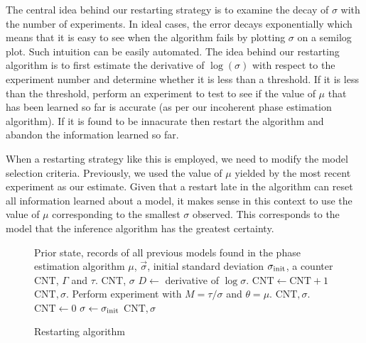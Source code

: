\documentclass[aps,pra,amsmath,twocolumn,amssymb,superscriptaddress]{revtex4-1}
\newcommand{\CRej}{\text{RejS }}
\begin{document}
The central idea behind our restarting strategy is to examine the decay of $\sigma$ with the number of experiments.  In ideal cases, the error decays exponentially which means that it is easy to see when the algorithm fails by plotting $\sigma$ on a semilog plot.  Such intuition can be easily automated.  The idea behind our restarting algorithm is to first estimate the derivative of $\log(\sigma)$ with respect to the experiment number and determine whether it is less than a threshold.  If it is less than the threshold, perform an experiment to test to see if the value of $\mu$ that has been learned so far is accurate (as per our incoherent phase estimation algorithm).  If it is found to be innacurate then restart the algorithm and abandon the information learned so far.

When a restarting strategy like this is employed, we need to modify the model selection criteria.  Previously, we used the value of $\mu$ yielded by the most recent experiment as our estimate.   Given that a restart late in the algorithm can reset all information learned about a model, it makes sense in this context to use the value of $\mu$ corresponding to the smallest $\sigma$ observed.  This corresponds to the model that the inference algorithm has the greatest certainty.

\begin{figure}
\begin{algorithm}[H]
    \caption{Restarting algorithm}
    \label{alg:pghT2}
\begin{algorithmic}
        \Require Prior \CRej state, records of all previous models found in the phase estimation algorithm $\mu$, $\vec{\sigma}$, initial standard deviation $\sigma_{\rm init}$, a counter $\text{CNT}$, $\Gamma$ and $\tau$.
	\Ensure $\text{CNT}$, $\sigma$ 
	\State $D \gets$ derivative of $\log{\sigma}$.
		\State $\text{CNT}\gets \text{CNT}+1$
		\State \Return $\text{CNT},\sigma$.
        	\State Perform experiment with $M=\tau/\sigma$ and $\theta=\mu$.
			\State \Return $\text{CNT},\sigma$.
\Else{}
	\State $\text{CNT}\gets 0$
	\State $\sigma \gets \sigma_{\rm init}$
	\State \Return $\text{CNT}, \sigma$
\EndIf
	\EndIf
        \EndFunction
    \end{algorithmic}
\end{algorithm}
\end{figure}
\end{document}
